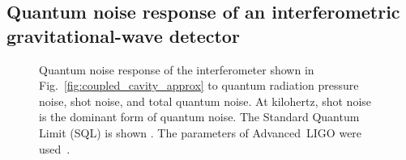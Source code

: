 




\subsection{Quantum noise response of an interferometric gravitational-wave detector}
\label{sec:qnoise_GW_IFO}

\begin{figure}
	\centering
	\caption{Quantum noise response of the interferometer shown in Fig.~\ref{fig:coupled_cavity_approx} to quantum radiation pressure noise, shot noise, and total quantum noise. At kilohertz, shot noise is the dominant form of quantum noise. The Standard Quantum Limit (SQL) is shown . The parameters of Advanced~LIGO were used~\cite{}. } %
	\label{fig:simplifed_QN_response_conventional}
\end{figure}


